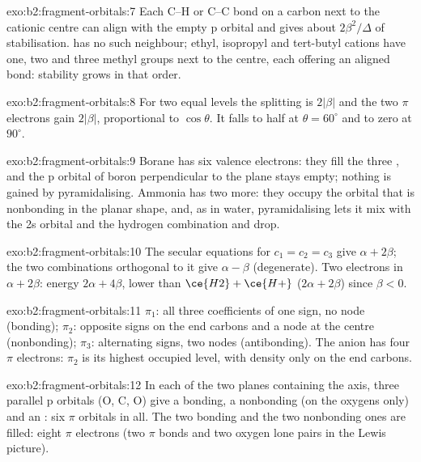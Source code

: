 \begin{solution}{exo:b2:fragment-orbitals:7}
Each C--H or C--C bond on a carbon next to the cationic centre can align with the
empty p orbital and gives about $2\beta^2/\Delta$ of stabilisation.  has no such
neighbour; ethyl, isopropyl and tert-butyl cations have one, two and three methyl
groups next to the centre, each offering an aligned bond: stability grows in that
order.
\end{solution}

\begin{solution}{exo:b2:fragment-orbitals:8}
For two equal levels the splitting is $2|\beta|$ and the two $\pi$ electrons gain $2|\beta|$,
proportional to $\cos\theta$. It falls to half at $\theta = 60^\circ$ and to zero at
$90^\circ$.
\end{solution}

\begin{solution}{exo:b2:fragment-orbitals:9}
Borane has six valence electrons: they fill the three , and the p
orbital of boron perpendicular to the plane stays empty; nothing is gained by
pyramidalising. Ammonia has two more: they occupy the orbital that is nonbonding in
the planar shape, and, as in water, pyramidalising lets it mix with the 2s orbital and
the hydrogen combination and drop.
\end{solution}

\begin{solution}{exo:b2:fragment-orbitals:10}
The secular equations for $c_1 = c_2 = c_3$ give $\alpha + 2\beta$; the two combinations
orthogonal to it give $\alpha - \beta$ (degenerate). Two electrons in $\alpha + 2\beta$: energy
$2\alpha + 4\beta$, lower than $\ce{H2} + \ce{H+}$ ($2\alpha + 2\beta$) since $\beta < 0$.
\end{solution}

\begin{solution}{exo:b2:fragment-orbitals:11}
$\pi_1$: all three coefficients of one sign, no node (bonding); $\pi_2$: opposite signs
on the end carbons and a node at the centre (nonbonding); $\pi_3$: alternating
signs, two nodes (antibonding). The anion has four $\pi$ electrons: $\pi_2$ is its
highest occupied level, with density only on the end carbons.
\end{solution}

\begin{solution}{exo:b2:fragment-orbitals:12}
In each of the two planes containing the axis, three parallel p orbitals (O, C, O)
give a bonding, a nonbonding (on the oxygens only) and an : six
$\pi$ orbitals in all. The two bonding and the two nonbonding ones are filled: eight
$\pi$ electrons (two $\pi$ bonds and two oxygen lone pairs in the Lewis picture).
\end{solution}

